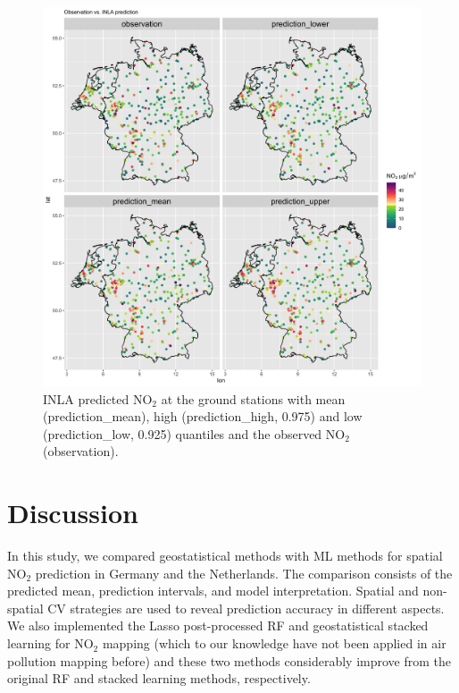 \documentclass{article}
\begin{document}
\begin{figure}
\centering
\includegraphics[scale =0.1]{fig/pred_11var.png}
\caption{INLA predicted NO$_2$ at the ground stations with mean (prediction\_mean), high (prediction\_high, 0.975) and low (prediction\_low, 0.925) quantiles and the observed NO$_2$ (observation).}
\label{INLApred}
\end{figure}


\section{Discussion}
In this study, we compared geostatistical methods with ML methods for spatial NO$_2$ prediction in Germany and the Netherlands. The comparison consists of the predicted mean, prediction intervals, and model interpretation. Spatial and non-spatial CV strategies are used to reveal prediction accuracy in different aspects. We also implemented the Lasso post-processed RF and geostatistical stacked learning for NO$_2$ mapping (which to our knowledge have not been applied in air pollution mapping before) and these two methods considerably improve from the original RF and stacked learning methods, respectively. %
\end{document}
